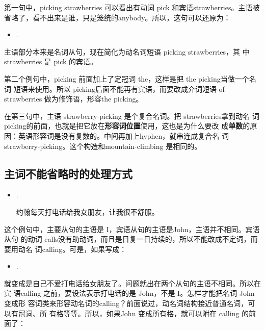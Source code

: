 第一句中，picking strawberries 可以看出有动词 pick 和宾语strawberries。主语被
省略了，看不出来是谁，只是笼统的anybody。所以，这句可以还原为：

\begin{itemize}
\item  {}  .
\end{itemize}

主语部分本来是名词从句，现在简化为动名词短语 picking strawberries，其
中strawberries 是 pick 的宾语。

第二个例句中，picking 前面加上了定冠词 the，这样是把 the picking当做一个名词
短语来使用。所以 picking后面不能再有宾语，而要改成介词短语 of strawberries
做为修饰语，形容the picking。

在第三句中，主语 strawberry-picking 是个复合名词。把 strawberries拿到动名
词 picking的前面，也就是把它放在\textbf{形容词位置}使用，这也是为什么要改
成\textbf{单数}的原因：英语形容词是没有复数的。中间再加上hyphen，就串连成复合名
词 strawberry-picking。这个构造和mountain-climbing 是相同的。

\subsection{主词不能省略时的处理方式}

\begin{itemize}
\item {}  .

约翰每天打电话给我女朋友，让我很不舒服。
\end{itemize}

这个例句中，主要从句的主语是 I，宾语从句的主语是John，主语并不相同。宾语从句
的动词 calls没有助动词，而且是日复一日持续的，所以不能改成不定词，而要用动名
词calling。可是，如果写成：

\begin{itemize}
\item {}  .
\end{itemize}

就变成是自己不爱打电话给女朋友了。问题就出在两个从句的主语不相同。所以在宾
语calling 之前，要设法表示打电话的是 John，不是 I。怎样才能把名词 John变成形
容词类来形容动名词的calling？前面说过，动名词结构接近普通名词，可以有冠词、所
有格等等。所以，如果John 变成所有格，就可以附在 calling 的前面了：

